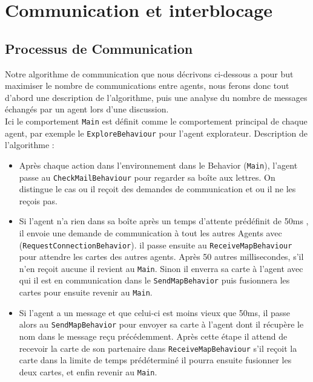 \documentclass[10pt]{article}
\newcommand\tab[1][0.65cm]{\hspace*{#1}}
\begin{document}
\section{Communication et interblocage}

\subsection{Processus de Communication}
Notre algorithme de communication que nous décrivons ci-dessous a pour but maximiser le nombre de communications entre agents, nous ferons donc tout d'abord une description de l'algorithme, puis une analyse du nombre de messages échangés par un agent lors d'une discussion.\\
\linebreak   
\tab Ici le comportement \texttt{Main} est définit comme le comportement principal de chaque agent, par exemple le \texttt{ExploreBehaviour} pour l'agent explorateur. 
Description de l'algorithme :
\begin{itemize}
\item Après chaque action dans l'environnement dans le Behavior (\texttt{Main}), l'agent passe au \texttt{CheckMailBehaviour} pour regarder sa boîte aux lettres. On distingue le cas ou il reçoit des demandes de communication  et ou il ne les reçois pas.

\item Si l'agent n'a rien dans sa boîte après un temps d'attente prédéfinit de 50ms , il envoie une demande de communication à tout les autres Agents avec (\texttt{RequestConnectionBehavior}). il passe ensuite au \texttt{ReceiveMapBehaviour} pour attendre les cartes des autres agents. Après 50 autres millisecondes, s'il n'en reçoit aucune il revient au \texttt{Main}. Sinon il enverra sa carte à l'agent avec qui il est en communication dans le \texttt{SendMapBehavior} puis fusionnera les cartes pour ensuite revenir au \texttt{Main}.

\item Si l'agent a un message et que celui-ci est moins vieux que 50ms, il passe alors au \texttt{SendMapBehavior} pour envoyer sa carte à l'agent dont il récupère le nom dans le message reçu précédemment. Après cette étape il attend de recevoir la carte de son partenaire dans \texttt{ReceiveMapBehaviour} s'il reçoit la carte dans la limite de temps prédéterminé il pourra ensuite fusionner les deux cartes, et enfin revenir au \texttt{Main}.\\
\end{itemize}
\end{document}
